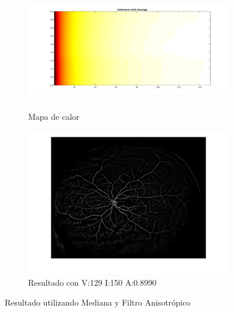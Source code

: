 \begin{figure}[H]
\begin{subfigure}[b]{0.48\textwidth}
        \includegraphics[height=5.3cm,width=1\textwidth]{./Figures/Results/coherenceWithAverageColorMap.png}
        \caption{Mapa de calor}
        \label{fig:thermalforanisodiffwithmedianacentered}
  \end{subfigure}
  \begin{subfigure}[b]{0.48\textwidth}
        \includegraphics[width=1\textwidth]{./Figures/Results/coherenceWithAverageV129I150.png}
        \caption{Resultado con V:129 I:150 A:0.8990}
        \label{fig:thermalforanisodiffwithmedianacentered}
  \end{subfigure}
	\label{fig:thermalfigure}
	\caption{Resultado utilizando Mediana y Filtro Anisotr\'opico}
\end{figure}



